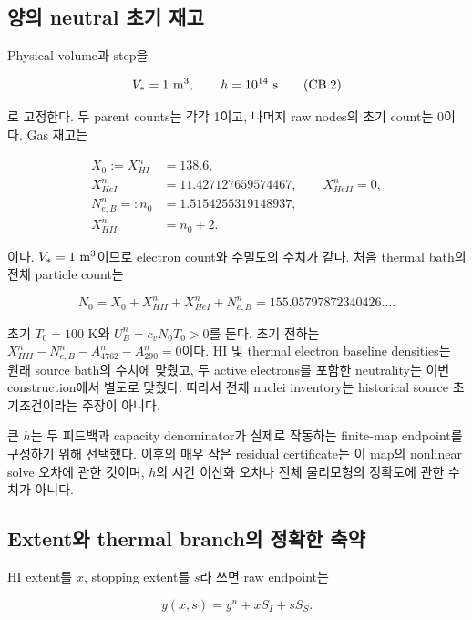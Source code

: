 \hypertarget{uxc591uxc758-neutral-uxcd08uxae30-uxc7acuxace0}{%
\subsection{양의 neutral 초기 재고}\label{uxc591uxc758-neutral-uxcd08uxae30-uxc7acuxace0}}

Physical volume과 step을

\[
 V_*=1\ {\rm m^3},\qquad h=10^{14}\ {\rm s}
 \tag{CB.2}
\]

로 고정한다. 두 parent counts는 각각 1이고, 나머지 raw nodes의 초기 count는 0이다. Gas 재고는

\[
 \begin{aligned}
 X_0:=X_{HI}^n&=138.6,\\
 X_{HeI}^n&=11.427127659574467,\qquad X_{HeII}^n=0,\\
 N_{e,B}^n=:n_0&=1.5154255319148937,\\
 X_{HII}^n&=n_0+2.
 \end{aligned}\tag{CB.3}
\]

이다. \(V_*=1\ {\rm m^3}\)이므로 electron count와 수밀도의 수치가 같다. 처음 thermal bath의 전체 particle count는

\[
 N_0=X_0+X_{HII}^n+X_{HeI}^n+N_{e,B}^n
      =155.05797872340426\ldots .
 \tag{CB.4}
\]

초기 \(T_0=100\) K와 \(U_B^n=c_vN_0T_0>0\)를 둔다. 초기 전하는 \(X_{HII}^n-N_{e,B}^n-A_{4762}^n-A_{290}^n=0\)이다. HI 및 thermal electron baseline densities는 원래 source bath의 수치에 맞췄고, 두 active electrons를 포함한 neutrality는 이번 construction에서 별도로 맞췄다. 따라서 전체 nuclei inventory는 historical source 초기조건이라는 주장이 아니다.

큰 \(h\)는 두 피드백과 capacity denominator가 실제로 작동하는 finite-map endpoint를 구성하기 위해 선택했다. 이후의 매우 작은 residual certificate는 이 map의 nonlinear solve 오차에 관한 것이며, \(h\)의 시간 이산화 오차나 전체 물리모형의 정확도에 관한 수치가 아니다.

\hypertarget{extentuxc640-thermal-branchuxc758-uxc815uxd655uxd55c-uxcd95uxc57d}{%
\subsection{Extent와 thermal branch의 정확한 축약}\label{extentuxc640-thermal-branchuxc758-uxc815uxd655uxd55c-uxcd95uxc57d}}

HI extent를 \(x\), stopping extent를 \(s\)라 쓰면 raw endpoint는

\[
 y(x,s)=y^n+xS_I+sS_S.
 \tag{CB.5}
\]

